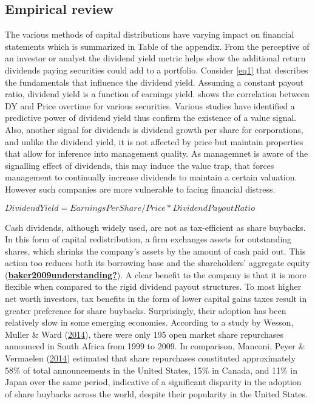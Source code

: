 \documentclass[11pt,preprint, authoryear]{elsarticle}
\numberwithin{equation}{section}
\numberwithin{figure}{section}
\numberwithin{table}{section}
\begin{document}
\hypertarget{empirical-review}{%
\subsection{Empirical review}\label{empirical-review}}

The various methods of capital distributions have varying impact on
financial statements which is summarized in Table of the appendix. From
the perceptive of an investor or analyst the dividend yield metric helps
show the additional return dividends paying securities could add to a
portfolio. Consider \ref{eq1} that describes the fundamentals that
influence the dividend yield. Assuming a constant payout ratio, dividend
yield is a function of earnings yield. shows the correlation between DY
and Price overtime for various securities. Various studies have
identified a predictive power of dividend yield thus confirm the
existence of a value signal. Also, another signal for dividends is
dividend growth per share for corporations, and unlike the dividend
yield, it is not affected by price but maintain properties that allow
for inference into management quality. As managemnet is aware of the
signalling effect of dividends, this may induce the value trap, that
forces management to continually increase dividends to maintain a
certain valuation. However such companies are more vulnerable to facing
financial distress.

\(Dividend Yield =Earnings Per Share/Price*Dividend Payout Ratio\)
\label{eq1}

Cash dividends, although widely used, are not as tax-efficient as share
buybacks. In this form of capital redistribution, a firm exchanges
assets for outstanding shares, which shrinks the company's assets by the
amount of cash paid out. This action too reduces both its borrowing base
and the shareholders' aggregate equity
(\protect\hyperlink{ref-baker2009understanding}{\textbf{baker2009understanding?}}).
A clear benefit to the company is that it is more flexible when compared
to the rigid dividend payout structures. To most higher net worth
investors, tax benefits in the form of lower capital gains taxes result
in greater preference for share buybacks. Surprisingly, their adoption
has been relatively slow in some emerging economies. According to a
study by Wesson, Muller \& Ward
(\protect\hyperlink{ref-wesson2014market}{2014}), there were only 195
open market share repurchases announced in South Africa from 1999 to
2009. In comparison, Manconi, Peyer \& Vermaelen
(\protect\hyperlink{ref-manconi2014buybacks}{2014}) estimated that share
repurchases constituted approximately 58\% of total announcements in the
United States, 15\% in Canada, and 11\% in Japan over the same period,
indicative of a significant disparity in the adoption of share buybacks
across the world, despite their popularity in the United States.
\end{document}
